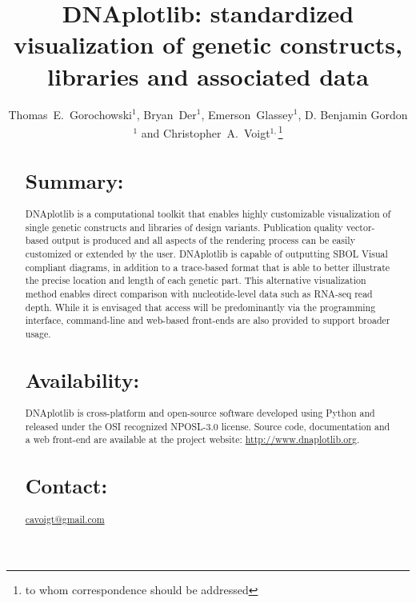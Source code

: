 \documentclass{bioinfo}
\begin{document}

\title[DNAplotlib]{DNAplotlib: standardized visualization of genetic constructs, libraries and associated data}
\author[Thomas E. Gorochowski \textit{et~al.}]{Thomas~E.~Gorochowski$^{1}$, Bryan~Der$^{1}$, Emerson~Glassey$^{1}$, D. Benjamin Gordon$^{1}$ and Christopher~A.~Voigt$^{1,}$\footnote{to whom correspondence should be addressed}}
\address{$^{1}$Department of Biological Engineering, Synthetic Biology Center, Massachusetts Institute of Technology, USA.}



\maketitle

\begin{abstract}

\section{Summary:}
DNAplotlib is a computational toolkit that enables highly customizable visualization of single genetic constructs and libraries of design variants. Publication quality vector-based output is produced and all aspects of the rendering process can be easily customized or extended by the user. DNAplotlib is capable of outputting SBOL Visual compliant diagrams, in addition to a trace-based format that is able to better illustrate the precise location and length of each genetic part. This alternative visualization method enables direct comparison with nucleotide-level data such as RNA-seq read depth. While it is envisaged that access will be predominantly via the programming interface, command-line and web-based front-ends are also provided to support broader usage.

\section{Availability:}
DNAplotlib is cross-platform and open-source software developed using Python and released under the OSI recognized NPOSL-3.0 license. Source code, documentation and a web front-end are available at the project website: \href{http://www.dnaplotlib.org}{http://www.dnaplotlib.org}.

\section{Contact:} \href{cavoigt@gmail.com}{cavoigt@gmail.com}
\end{abstract}
\end{document}
